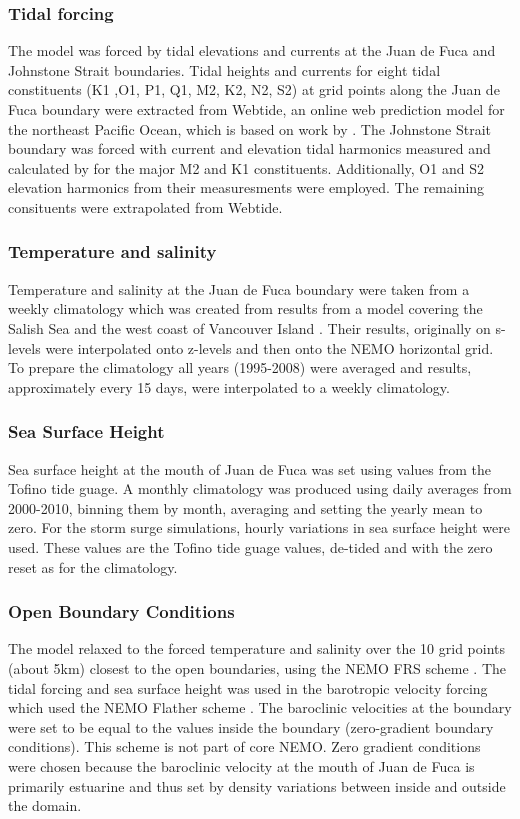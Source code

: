 \documentclass[pdftex,10pt]{article}
\begin{document}
\subsubsection{Tidal forcing} 
The model was forced by tidal elevations and currents at the Juan de Fuca and Johnstone Strait boundaries. Tidal heights and currents for eight tidal constituents (K1 ,O1, P1, Q1, M2, K2, N2, S2) at grid points along the Juan de Fuca boundary were extracted from Webtide, an online web prediction model for the northeast Pacific Ocean, which is based on work by \citet{foreman2000webtide}. The Johnstone Strait boundary was forced with current and elevation tidal harmonics measured and calculated by \citet{thomson1980johnstone} for the major M2 and K1 constituents. Additionally, O1 and S2 elevation harmonics from their measuresments were employed. The remaining consituents were extrapolated from Webtide. 

\subsubsection{Temperature and salinity}
Temperature and salinity at the Juan de Fuca boundary were taken from a weekly climatology which was created from results from a model covering the Salish Sea and the west coast of Vancouver Island \citep{massonfine2012}.  Their results, originally on s-levels were interpolated onto z-levels and then onto the NEMO horizontal grid.  To prepare the climatology all years (1995-2008) were averaged and results, approximately every 15 days, were interpolated to a weekly climatology.

\subsubsection{Sea Surface Height}
Sea surface height at the mouth of Juan de Fuca was set using values from the Tofino tide guage.  A monthly climatology was produced using daily averages from 2000-2010, binning them by month, averaging and setting the yearly mean to zero.  For the storm surge simulations, hourly variations in sea surface height were used.  These values are the Tofino tide guage values, de-tided and with the zero reset as for the climatology.

\subsubsection{Open Boundary Conditions}

The model relaxed to the forced temperature and salinity over the 10 grid points (about 5km) closest to the open boundaries, using the NEMO FRS scheme \citep{madec2008nemo}. %
The tidal forcing and sea surface height was used in the barotropic velocity forcing which used the NEMO Flather scheme \citet{madec2008nemo}. %
The baroclinic velocities at the boundary were set to be equal to the values inside the boundary (zero-gradient boundary conditions).  This scheme is not part of core NEMO.  Zero gradient conditions were chosen because the baroclinic velocity at the mouth of Juan de Fuca is primarily estuarine and thus set by density variations between inside and outside the domain.
\end{document}
